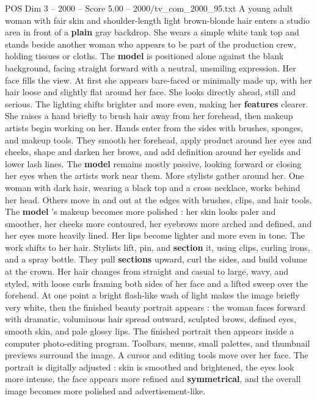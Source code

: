 \begin{textsample}{POS Dim 3 – 2000 – Score 5.00 – 2000/tv\_com\_2000\_95.txt}  \label{ex:f3_pos_066}
A young adult woman with fair skin and shoulder-length light brown-blonde hair enters a studio area in front of a \textbf{plain} gray backdrop.
She wears a simple white tank top and stands beside another woman who appears to be part of the production crew, holding tissues or cloths.
The \textbf{model} is positioned alone against the blank background, facing straight forward with a neutral, unsmiling expression.
Her face fills the view.
At first she appears bare-faced or minimally made up, with her hair loose and slightly flat around her face.
She looks directly ahead, still and serious.
The lighting shifts brighter and more even, making her \textbf{features} clearer.
She raises a hand briefly to brush hair away from her forehead, then makeup artists begin working on her.
Hands enter from the sides with brushes, sponges, and makeup tools.
They smooth her forehead, apply product around her eyes and cheeks, shape and darken her brows, and add definition around her eyelids and lower lash lines.
The \textbf{model} remains mostly passive, looking forward or closing her eyes when the artists work near them.
More stylists gather around her.
One woman with dark hair, wearing a black top and a cross necklace, works behind her head.
Others move in and out at the edges with brushes, clips, and hair tools.
The \textbf{model} ’s makeup becomes more polished : her skin looks paler and smoother, her cheeks more contoured, her eyebrows more arched and defined, and her eyes more heavily lined.
Her lips become lighter and more even in tone.
The work shifts to her hair.
Stylists lift, pin, and \textbf{section} it, using clips, curling irons, and a spray bottle.
They pull \textbf{sections} upward, curl the sides, and build volume at the crown.
Her hair changes from straight and casual to large, wavy, and styled, with loose curls framing both sides of her face and a lifted sweep over the forehead.
At one point a bright flash-like wash of light makes the image briefly very white, then the finished beauty portrait appears : the woman faces forward with dramatic, voluminous hair spread outward, sculpted brows, defined eyes, smooth skin, and pale glossy lips.
The finished portrait then appears inside a computer photo-editing program.
Toolbars, menus, small palettes, and thumbnail previews surround the image.
A cursor and editing tools move over her face.
The portrait is digitally adjusted : skin is smoothed and brightened, the eyes look more intense, the face appears more refined and \textbf{symmetrical}, and the overall image becomes more polished and advertisement-like.

\end{textsample}

